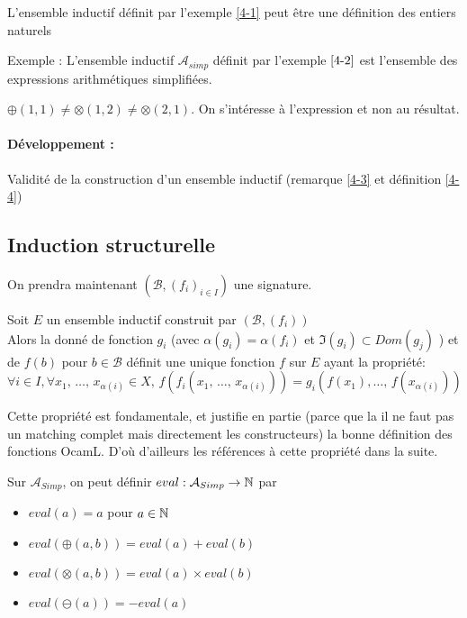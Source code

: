 \begin{example}
	L'ensemble inductif définit par l'exemple \ref{4-1} peut être une définition des entiers naturels \label{4-6}
\end{example}

\begin{example}
	Exemple : L'ensemble inductif $\mathcal A_{simp}$ définit par l'exemple $\ref{4-2}$ est l'ensemble des expressions arithmétiques simplifiées.
\end{example}

\begin{rem}
	$\oplus(1, 1) \neq \otimes(1, 2) \neq \otimes(2, 1)$. On s'intéresse à l'expression et non au résultat.
\end{rem}

\paragraph{Développement :} Validité de la construction d'un ensemble inductif (remarque \ref{4-3} et définition \ref{4-4})

\subsection{Induction structurelle}
On prendra maintenant $(\mathcal B, (f_i)_{i \in I})$ une signature.

\begin{proposition}
	\label{4-5}
	Soit $E$ un ensemble inductif construit par $(\mathcal B, (f_i))$\\
	
	Alors la donné de fonction $g_i$ (avec $\alpha(g_i) = \alpha(f_i)$ et $\Im(g_i) \subset Dom(g_j)$ ) et de $f(b)$ pour $b \in \mathcal B$ définit une unique fonction $f$ sur $E$ ayant la propriété:
	$$\forall i \in I, \forall x_1, \, \dots , \, x_{\alpha(i)} \in X, \, f\left(f_i(x_1, \, \dots, \, x_{\alpha(i)})\right) =  g_i\left(f(x_1), \dots, \, f(x_{\alpha(i)})\right)$$
\end{proposition}

\begin{com}
	Cette propriété est fondamentale, et justifie en partie (parce que la il ne faut pas un matching complet mais directement les constructeurs) la bonne définition des fonctions OcamL. D'où d'ailleurs les références à cette propriété dans la suite.
\end{com}


\begin{example}
	Sur $\mathcal A_{Simp}$, on peut définir $eval : \mathcal A_{Simp} \to \mathbb{N}$ par \begin{itemize}
		\item $eval(a) = a$ pour $a \in \mathbb{N}$
		\item $eval(\oplus(a, b)) = eval(a) + eval(b)$
		\item $eval(\otimes(a, b)) = eval(a) \times  eval(b)$
		\item $eval(\ominus(a)) = - eval(a)$
	\end{itemize}
\end{example}

